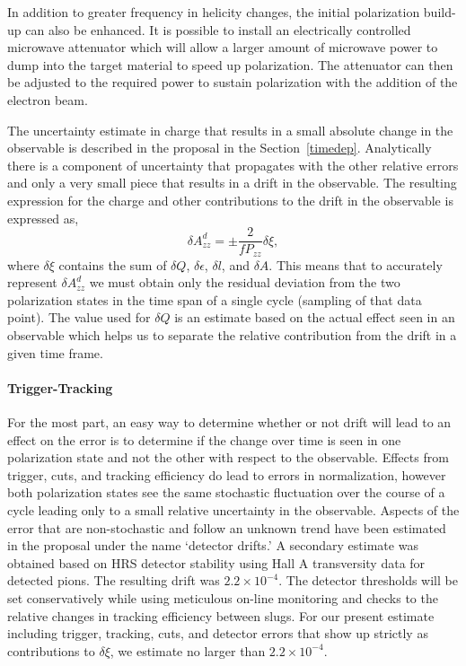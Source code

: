 In addition to greater frequency in helicity changes, the initial polarization build-up
can also be enhanced.  It is possible to install an electrically controlled microwave attenuator which will allow a larger amount of microwave power to dump into the target material to speed up polarization.  The attenuator can then be adjusted to the required power to sustain polarization with the addition of the electron beam.  

The uncertainty estimate in charge that results in a small absolute change in the observable is described
in the proposal in the Section~\ref{timedep}.  Analytically there is a component of uncertainty that propagates with the other
relative errors and only a very small piece that results in a drift in the observable.
The resulting expression for the charge and other contributions to the drift in the observable is expressed as,
\begin{equation}
\delta A^d_{zz}=\pm \frac{2}{fP_{zz}}\delta\xi,
\label{drift}
\end{equation}
where $\delta\xi$ contains the sum of $\delta Q$, $\delta \epsilon$, $\delta l$, and $\delta A$.  This means that
to accurately represent $\delta A^d_{zz}$ we must obtain only the residual deviation from the two polarization
states in the time span of a single cycle (sampling of that data point).  The value used for $\delta Q$ is an estimate based
on the actual effect seen in an observable which helps us to separate the relative contribution from the drift in a given time frame.

\paragraph{Trigger-Tracking }
\label{acc}
For the most part, an easy way to determine whether or not drift will lead to an
effect on the error is to determine if the change over time is seen in one polarization state and not the
other with respect to the observable.  Effects from trigger, cuts, and tracking efficiency do lead to errors in normalization,
however both polarization states see the same stochastic fluctuation over the course of a cycle leading only to a small relative uncertainty in the observable.  Aspects of the error that are non-stochastic
and follow an unknown trend have been estimated in the proposal under the name `detector drifts.'
A secondary estimate was obtained based on HRS detector stability using Hall A transversity data for
detected pions.  The resulting drift was $2.2\times10^{-4}$.
The detector thresholds will be set conservatively while using meticulous on-line monitoring and checks to the relative changes in tracking efficiency between slugs.  For our present estimate including trigger, tracking, cuts, and detector errors that show up strictly as contributions to $\delta\xi$, we estimate no larger than $2.2\times10^{-4}$.

